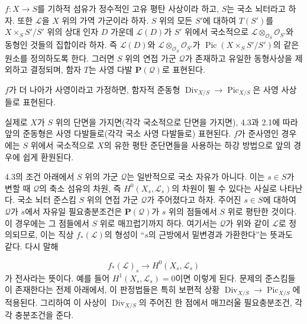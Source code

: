  $f:X\longrightarrow S$를 기하적 섬유가 정수적인
고유 평탄 사상이라 하고, $S$는 국소 뇌터라고 하자. 또한 $\mathcal L$을
$X$ 위의 가역 가군이라 하자. $S$ 위의 모든 $S'$에 대하여 $T(S')$를
$X\times_SS'/S'$ 위의 상대 인자 $D$ 가운데 $\mathcal L(D)$가
$S'$ 위에서 국소적으로
$\mathcal L\otimes_{\mathcal O_S}\mathcal O_{S'}$와 동형인 것들의
집합이라 하자. 즉 $\mathcal L(D)$와
$\mathcal L\otimes_{\mathcal O_S}\mathcal O_{S'}$가
$\operatorname{Pic}(X\times_SS'/S')$의 같은 원소를 정의하도록 한다.
그러면 $S$ 위의 연접 가군 $\mathcal Q$가 존재하고 유일한 동형사상을
제외하고 결정되며, 함자 $T$는 사영 다발 $\mathbf P(\mathcal Q)$로
표현된다.

 $f$가 더 나아가 사영이라고 가정하면, 함자적
준동형
$\operatorname{Div}_{X/S}\longrightarrow\operatorname{Pic}_{X/S}$은
사영 사상들로 표현된다.

실제로 $X$가 $S$ 위의 단면을 가지면(각각 국소적으로 단면을 가지면),
4.3과 2.1에 따라 앞의 준동형은 사영 다발들로(각각 국소 사영 다발들로)
표현된다. $f$가 준사영인 경우에는 $S$ 위에서 국소적으로 $X$의 유한
평탄 준단면들을 사용하는 하강 방법으로 앞의 경우에 쉽게 환원된다.

 4.3의 조건 아래에서 $S$ 위의 가군 $\mathcal Q$는
일반적으로 국소 자유가 아니다. 이는 $s\in S$가 변할 때
$\mathcal Q$의 축소 섬유의 차원, 즉 $H^0(X_s,\mathcal L_s)$의 차원이
뛸 수 있다는 사실로 나타난다. 국소 뇌터 준스킴 $S$ 위의 연접 가군
$\mathcal Q$가 주어졌다고 하자. 주어진 $s\in S$에 대하여
$\mathcal Q$가 $s$에서 자유일 필요충분조건은
$\mathbf P(\mathcal Q)$가 $s$ 위의 점들에서 $S$ 위로 평탄한 것이다.
이 경우에는 그 점들에서 $S$ 위로 매끄럽기까지 하다. 여기서는
$\mathcal Q$가 위와 같이 $\mathcal L$로 정의되므로, 이는 직상
$f_*(\mathcal L)$의 형성이 “$s$의 근방에서 밑변경과 가환한다”는 뜻과도
같다. 다시 말해

\[
f_*(\mathcal L)_s\longrightarrow H^0(X_s,\mathcal L_s)
\]
가 전사라는 뜻이다. 예를 들어 $H^1(X_s,\mathcal L_s)=0$이면 이렇게
된다. 문제의 준스킴들이 존재한다는 전제 아래에서, 이 판정법들은 특히
보편적 상황
$\operatorname{Div}_{X/S}\longrightarrow\operatorname{Pic}_{X/S}$에
적용된다. 그리하여 이 사상이 $\operatorname{Div}_{X/S}$의 주어진 한
점에서 매끄러울 필요충분조건, 각각 충분조건을 준다.



